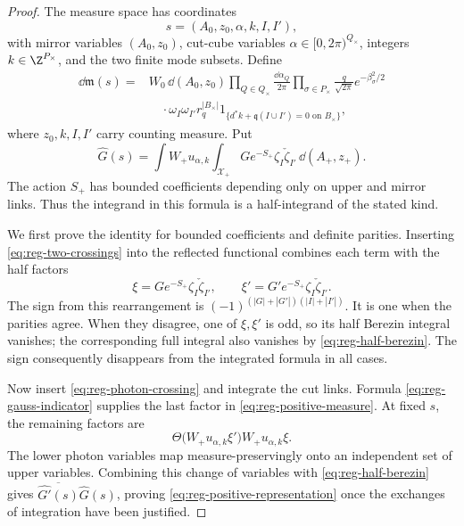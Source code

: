 \begin{proof}
The measure space has coordinates
\[
 s=(A_0,z_0,\alpha,k,I,I'),
\]
with mirror variables $(A_0,z_0)$, cut-cube variables
$\alpha\in[0,2\pi)^{Q_\times}$, integers $k\in\Z^{P_\times}$, and
the two finite mode subsets. Define
\begin{align}\label{eq:reg-positive-measure}
 \dd\mathfrak m(s)={}&W_0\,\dd(A_0,z_0)
     \prod_{Q\in Q_\times}\frac{\dd\alpha_Q}{2\pi}
     \prod_{\sigma\in P_\times}
                         \frac{q}{\sqrt{2\pi}}e^{-\beta_\sigma^2/2}
 \nonumber\\
 &\quad\cdot\omega_I\omega_{I'}r_q^{|B_\times|}
        1_{\{d^*k+\mathfrak q(I\cup I')=0\text{ on }B_\times\}},
\end{align}
where $z_0,k,I,I'$ carry counting measure. Put
\begin{equation}\label{eq:reg-half-transform}
 \widehat G(s)=\int W_+u_{\alpha,k}
         \int_{\mathcal X_+}G e^{-S_+}\zeta_I\check\zeta_{I'}
                                      \,\dd(A_+,z_+).
\end{equation}
The action $S_+$ has bounded coefficients depending only on upper
and mirror links. Thus the integrand in this formula is a
half-integrand of the stated kind.

We first prove the identity for bounded coefficients and definite
parities. Inserting \eqref{eq:reg-two-crossings} into the reflected
functional combines each term with the half factors
\[
 \xi=G e^{-S_+}\zeta_I\check\zeta_{I'},\qquad
 \xi'=G'e^{-S_+}\zeta_I\check\zeta_{I'}.
\]
The sign from this rearrangement is
$(-1)^{(|G|+|G'|)(|I|+|I'|)}$. It is one when the parities agree.
When they disagree, one of $\xi,\xi'$ is odd, so its half Berezin
integral vanishes; the corresponding full integral also vanishes
by \eqref{eq:reg-half-berezin}. The sign consequently disappears
from the integrated formula in all cases.

Now insert \eqref{eq:reg-photon-crossing} and integrate the cut
links. Formula \eqref{eq:reg-gauss-indicator} supplies the last
factor in \eqref{eq:reg-positive-measure}. At fixed $s$, the
remaining factors are
\[
 \Theta\bigl(W_+u_{\alpha,k}\xi'\bigr)
                    W_+u_{\alpha,k}\xi.
\]
The lower photon variables map measure-preservingly onto an
independent set of upper variables. Combining this change of
variables with \eqref{eq:reg-half-berezin} gives
$\overline{\widehat{G'}(s)}\widehat G(s)$, proving
\eqref{eq:reg-positive-representation} once the exchanges of
integration have been justified.


\end{proof}
